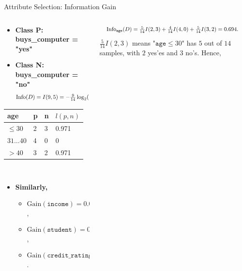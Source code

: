 \begin{frame}{Attribute Selection: Information Gain}
  \begin{columns}
    \begin{column}{0.45\textwidth}
      \begin{itemize}
      \item \textbf{Class P: buys\_computer = "yes"}
      \item \textbf{Class N: buys\_computer = "no"}
        \begin{align*}
          \resizebox{7cm}{!}{%
          $\text{Info}(D) = I(9,5) = - \frac{9}{14}\log_2(\frac{9}{14})-\frac{5}{14} \log_2(\frac{5}{14}) = 0.94$
          }
        \end{align*}
      \end{itemize}
      \centering
      \begin{tabular}{|l|l|l|l|}
        \hline
        \cellcolor{blue!20}age & \cellcolor{blue!20}p & \cellcolor{blue!20}n & \cellcolor{blue!20}$l(p,n)$ \\\hline
        \cellcolor{yellow!20}$\leq 30$ & 2 & 3 & 0.971 \\\hline
        \cellcolor{yellow!20}$31\ldots40$ & 4 & 0 & 0 \\\hline
        \cellcolor{yellow!20}$>40$ & 3 & 2 & 0.971 \\\hline
      \end{tabular}\\[0.2cm]
      \begin{itemize}
      \item \textbf{Similarly,}
        \begin{itemize}
        \item $\text{Gain}(\texttt{income}) = 0.029$,
        \item $\text{Gain}(\texttt{student}) = 0.090$,
        \item $\text{Gain}(\texttt{credit\_rating}) = 0.048$.
        \end{itemize}
      \end{itemize}
    \end{column}
    \begin{column}{0.45\textwidth}
      \vspace{-1.3cm}
      \begin{align*}
        \resizebox{7cm}{!}{%
        $\text{Info}_{\texttt{age}}(D) = \frac{5}{14}I(2,3) + \frac{4}{14} I(4,0) + \frac{5}{14} I(3,2) = 0.694$.
        }
      \end{align*}
      $\frac{5}{14} I(2,3)$ means "$\texttt{age} \leq 30$" has $5$ out of $14$ samples, with $2$ yes'es and $3$ no's. Hence,

\end{column}
\end{columns}
\end{frame}

